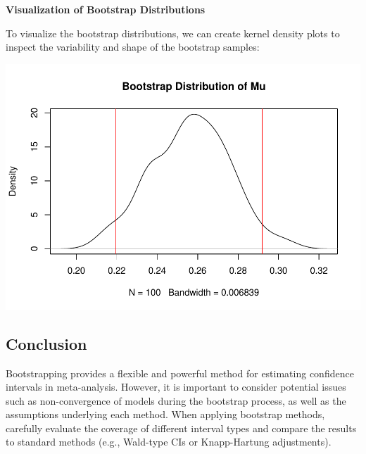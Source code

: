 \documentclass[
]{book}
\newenvironment{Shaded}{\begin{snugshade}}{\end{snugshade}}
\newcommand{\AttributeTok}[1]{\textcolor[rgb]{0.13,0.29,0.53}{#1}}
\newcommand{\CommentTok}[1]{\textcolor[rgb]{0.56,0.35,0.01}{\textit{#1}}}
\newcommand{\DecValTok}[1]{\textcolor[rgb]{0.00,0.00,0.81}{#1}}
\newcommand{\FloatTok}[1]{\textcolor[rgb]{0.00,0.00,0.81}{#1}}
\newcommand{\FunctionTok}[1]{\textcolor[rgb]{0.13,0.29,0.53}{\textbf{#1}}}
\newcommand{\NormalTok}[1]{#1}
\newcommand{\SpecialCharTok}[1]{\textcolor[rgb]{0.81,0.36,0.00}{\textbf{#1}}}
\newcommand{\StringTok}[1]{\textcolor[rgb]{0.31,0.60,0.02}{#1}}
\begin{document}
\textbf{Visualization of Bootstrap Distributions}

To visualize the bootstrap distributions, we can create kernel density plots to inspect the variability and shape of the bootstrap samples:

\begin{Shaded}
\end{Shaded}

\includegraphics{_main_files/figure-latex/unnamed-chunk-27-1.pdf}

\subsection{Conclusion}\label{conclusion-1}

Bootstrapping provides a flexible and powerful method for estimating confidence intervals in meta-analysis. However, it is important to consider potential issues such as non-convergence of models during the bootstrap process, as well as the assumptions underlying each method. When applying bootstrap methods, carefully evaluate the coverage of different interval types and compare the results to standard methods (e.g., Wald-type CIs or Knapp-Hartung adjustments).
\end{document}
